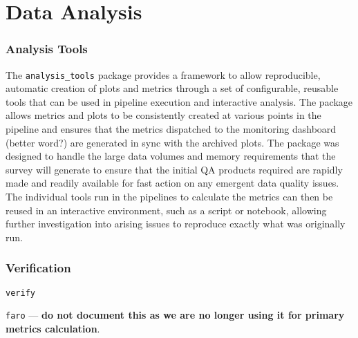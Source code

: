 \section{Data Analysis}
\label{sec:analysis}

\subsubsection{Analysis Tools}

The \texttt{analysis\_tools} package provides a framework to allow reproducible, automatic creation of plots and metrics through a set of configurable, reusable tools that can be used in pipeline execution and interactive analysis.
The package allows metrics and plots to be consistently created at various points in the pipeline and ensures that the metrics dispatched to the monitoring dashboard (better word?) are generated in sync with the archived plots.
The package was designed to handle the large data volumes and memory requirements that the survey will generate to ensure that the initial QA products required are rapidly made and readily available for fast action on any emergent data quality issues.
The individual tools run in the pipelines to calculate the metrics can then be reused in an interactive environment, such as a script or notebook, allowing further investigation into arising issues to reproduce exactly what was originally run.

\subsubsection{Verification}
\texttt{verify}

\texttt{faro} --- \textbf{do not document this as we are no longer using it for primary metrics calculation}.
